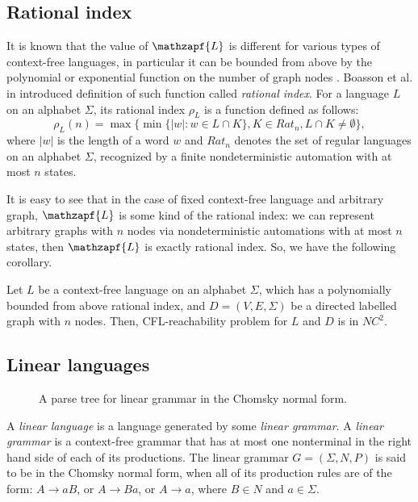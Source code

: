 \subsection{Rational index}
It is known that the value of $\mathzapf{L}$ is different for various types of context-free languages, in particular it can be bounded from above by the polynomial or exponential function on the number of graph nodes \cite*{Dyck1, CFRat, GreibRat}. Boasson et al. in \cite{RatBasic} introduced definition of such function called \textit{rational index}. For a language $L$ on an alphabet $\Sigma$, its rational index $\rho_L$ is a function defined as follows:
\begin{equation}
\rho_L(n) = \max\{\min\{|w|:w \in L \cap K\}, K \in {Rat}_n, L \cap K \neq \emptyset\},
\end{equation} where $|w|$ is the length of a word $w$ and ${Rat}_n$ denotes the set of regular languages on an alphabet $\Sigma$, recognized by a finite nondeterministic automation with at most $n$ states.


It is easy to see that in the case of fixed context-free language and arbitrary graph, $\mathzapf{L}$ is some kind of the rational index: we can represent arbitrary graphs with $n$ nodes via nondeterministic automations with at most $n$ states, then $\mathzapf{L}$ is exactly rational index. So, we have the following corollary.
\begin{corollary}
\label{ratdepth}
Let $L$ be a context-free language on an alphabet $\Sigma$, which has a polynomially bounded from above rational index, and $D=(V, E, \Sigma)$ be a directed labelled graph with $n$ nodes. Then, CFL-reachability problem for $L$ and $D$ is in $NC^2$.
\end{corollary}
\subsection{Linear languages}
\begin{figure}
\caption{A parse tree for linear grammar in the Chomsky normal form.}
\label{ptlin}       %
\end{figure}
A \textit{linear language} is a language generated by some \textit{linear grammar}. A \textit{linear grammar} is a context-free grammar that has at most one nonterminal in the right hand side of each of its productions. The linear grammar  $G = (\Sigma, N, P)$ is said to be in the Chomsky normal form, when all of its production rules are of the form: $A \rightarrow aB$, or $A \rightarrow Ba$, or $A \rightarrow a$, where $B \in N$ and $a \in \Sigma$.


